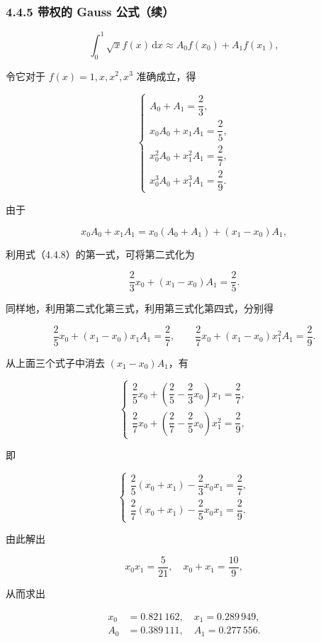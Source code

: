 \documentclass[
  10pt,
  fontset=fandol]{ctexart}
\begin{document}
\subsubsection{4.4.5 带权的 Gauss 公式（续）}\label{ux5e26ux6743ux7684-gauss-ux516cux5f0fux7eed}

\[
\int_0^1\sqrt{x}f(x)\,\mathrm{d}x\approx A_0f(x_0)+A_1f(x_1),
\tag{4.4.7}
\]

令它对于 \(f(x)=1,x,x^2,x^3\) 准确成立，得

\[
\begin{cases}
A_0+A_1=\dfrac23,\\[5pt]
x_0A_0+x_1A_1=\dfrac25,\\[5pt]
x_0^2A_0+x_1^2A_1=\dfrac27,\\[5pt]
x_0^3A_0+x_1^3A_1=\dfrac29.
\end{cases}
\tag{4.4.8}
\]

由于

\[
x_0A_0+x_1A_1=x_0(A_0+A_1)+(x_1-x_0)A_1,
\]

利用式（4.4.8）的第一式，可将第二式化为

\[
\frac23x_0+(x_1-x_0)A_1=\frac25.
\]

同样地，利用第二式化第三式，利用第三式化第四式，分别得

\[
\frac25x_0+(x_1-x_0)x_1A_1=\frac27,\qquad
\frac27x_0+(x_1-x_0)x_1^2A_1=\frac29.
\]

从上面三个式子中消去 \((x_1-x_0)A_1\)，有

\[
\begin{cases}
\dfrac25x_0+\left(\dfrac25-\dfrac23x_0\right)x_1=\dfrac27,\\[5pt]
\dfrac27x_0+\left(\dfrac27-\dfrac25x_0\right)x_1^2=\dfrac29,
\end{cases}
\]

即

\[
\begin{cases}
\dfrac25(x_0+x_1)-\dfrac23x_0x_1=\dfrac27,\\[5pt]
\dfrac27(x_0+x_1)-\dfrac25x_0x_1=\dfrac29.
\end{cases}
\]

由此解出

\[
x_0x_1=\frac5{21},\quad x_0+x_1=\frac{10}9,
\]

从而求出

\[
\begin{aligned}
x_0&=0.821\,162,\quad x_1=0.289\,949,\\
A_0&=0.389\,111,\quad A_1=0.277\,556.
\end{aligned}
\]
\end{document}
